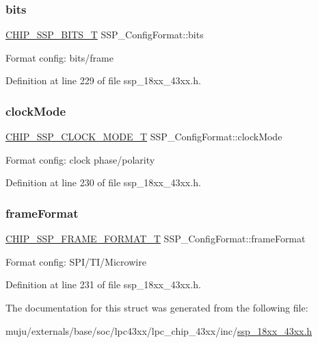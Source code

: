 \subsubsection{\texorpdfstring{bits}{bits}}
{\footnotesize\ttfamily \hyperlink{group___s_s_p__18_x_x__43_x_x_ga4e348748c4fb42ef94c2cbd968a43648}{C\+H\+I\+P\+\_\+\+S\+S\+P\+\_\+\+B\+I\+T\+S\+\_\+T} S\+S\+P\+\_\+\+Config\+Format\+::bits}

Format config\+: bits/frame 

Definition at line 229 of file ssp\+\_\+18xx\+\_\+43xx.\+h.

\mbox{\label{struct_s_s_p___config_format_a910e709c7d9e6e367a26028a939b69cf}} 
\subsubsection{\texorpdfstring{clock\+Mode}{clockMode}}
{\footnotesize\ttfamily \hyperlink{group___s_s_p__18_x_x__43_x_x_ga12dec81e345a9ffbefd6a1fae5759e09}{C\+H\+I\+P\+\_\+\+S\+S\+P\+\_\+\+C\+L\+O\+C\+K\+\_\+\+M\+O\+D\+E\+\_\+T} S\+S\+P\+\_\+\+Config\+Format\+::clock\+Mode}

Format config\+: clock phase/polarity 

Definition at line 230 of file ssp\+\_\+18xx\+\_\+43xx.\+h.

\mbox{\label{struct_s_s_p___config_format_ae702ac713d3aa81bffdf140ad8942ec7}} 
\subsubsection{\texorpdfstring{frame\+Format}{frameFormat}}
{\footnotesize\ttfamily \hyperlink{group___s_s_p__18_x_x__43_x_x_ga207687847d9ab8385057ddeca53c2942}{C\+H\+I\+P\+\_\+\+S\+S\+P\+\_\+\+F\+R\+A\+M\+E\+\_\+\+F\+O\+R\+M\+A\+T\+\_\+T} S\+S\+P\+\_\+\+Config\+Format\+::frame\+Format}

Format config\+: S\+P\+I/\+T\+I/\+Microwire 

Definition at line 231 of file ssp\+\_\+18xx\+\_\+43xx.\+h.



The documentation for this struct was generated from the following file\+:\begin{DoxyCompactItemize}
\item 
muju/externals/base/soc/lpc43xx/lpc\+\_\+chip\+\_\+43xx/inc/\hyperlink{ssp__18xx__43xx_8h}{ssp\+\_\+18xx\+\_\+43xx.\+h}\end{DoxyCompactItemize}
